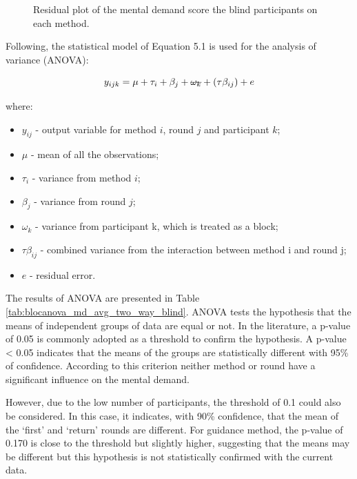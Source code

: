 \begin{figure}[!htb]
\begin{minipage}{0.45\textwidth}
        \caption{Residual plot of the mental demand score the blind participants on each method.}
        \label{fig:residplot_md_avg_two_way_blind}
    \end{minipage}
\end{figure}

Following, the statistical model of Equation 5.1 is used for the analysis of variance (ANOVA): 

\begin{equation}
    \label{eq:statistical_model}
    y_{ijk} = \mu + \tau_i + \beta_j + \msout{\omega_k} + (\tau\beta_{ij}) + e
\end{equation}

where:

\begin{itemize}
    \item $y_{ij}$ - output variable for method $i$, round $j$ and participant $k$;
    \item $\mu$ - mean of all the observations;
    \item $\tau_i$ - variance from method $i$;
    \item $\beta_j$ - variance from round $j$;
    \item \sout{$\omega_k$} - variance from participant k, which is treated as a block;
    \item $\tau\beta_{ij}$ - combined variance from the interaction between method i and round j;
    \item $e$ - residual error.
\end{itemize}

The results of ANOVA are presented in Table \ref{tab:blocanova_md_avg_two_way_blind}. ANOVA tests the hypothesis that the means of independent groups of data are equal or not. In the literature, a p-value of 0.05 is commonly adopted as a threshold to confirm the hypothesis. A p-value < 0.05 indicates that the means of the groups are statistically different with 95\% of confidence. According to this criterion neither method or round have a significant influence on the mental demand.

However, due to the low number of participants, the threshold of 0.1 could also be considered. In this case, it indicates, with 90\% confidence, that the mean of the ‘first’ and ‘return’ rounds are different. For guidance method, the p-value of 0.170 is close to the threshold but slightly higher, suggesting that the means may be different but this hypothesis is not statistically confirmed with the current data. 

